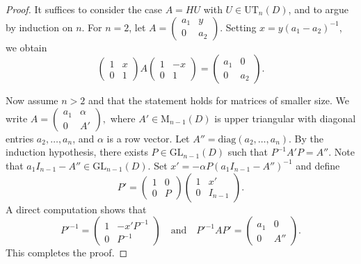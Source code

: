 \documentclass[10pt,a4paper]{amsart}
\begin{document}
				\begin{proof}
					It suffices to consider the case \( A = H U \) with \( U \in \mathrm{UT}_n(D) \), and to argue by induction on \( n \). For \( n = 2 \), let
					$
					A =
					\begin{pmatrix}
						a_1 & y \\
						0 & a_2
					\end{pmatrix}.
					$
					Setting \( x = y(a_1 - a_2)^{-1} \), we obtain
					\[
					\begin{pmatrix}
						1 & x \\
						0 & 1
					\end{pmatrix}
					A
					\begin{pmatrix}
						1 & -x \\
						0 & 1
					\end{pmatrix}
					=
					\begin{pmatrix}
						a_1 & 0 \\
						0 & a_2
					\end{pmatrix}.
					\]
					
					Now assume \( n > 2 \) and that the statement holds for matrices of smaller size. We write
					$
					A =
					\begin{pmatrix}
						a_1 & \alpha \\
						0 & A'
					\end{pmatrix},
					$
					where \( A' \in \mathrm{M}_{n-1}(D) \) is upper triangular with diagonal entries \( a_2, \ldots, a_n \), and \( \alpha \) is a row vector.	Let \( A'' = \mathrm{diag}(a_2, \ldots, a_n) \). By the induction hypothesis, there exists \( P \in \mathrm{GL}_{n-1}(D) \) such that \( P^{-1} A' P = A'' \). Note that \( a_1 I_{n-1} - A'' \in \mathrm{GL}_{n-1}(D) \). 	Set \( x' = -\alpha P (a_1 I_{n-1} - A'')^{-1} \) and define
					\[
					P' =
					\begin{pmatrix}
						1 & 0 \\
						0 & P
					\end{pmatrix}
					\begin{pmatrix}
						1 & x' \\
						0 & I_{n-1}
					\end{pmatrix}.
					\]
					A direct computation shows that
					\[
					P'^{-1} =
					\begin{pmatrix}
						1 & -x' P^{-1} \\
						0 & P^{-1}
					\end{pmatrix}
					\quad \text{and} \quad
					P'^{-1} A P' =
					\begin{pmatrix}
						a_1 & 0 \\
						0 & A''
					\end{pmatrix}.
					\]
					This completes the proof.
				\end{proof}
\end{document}

